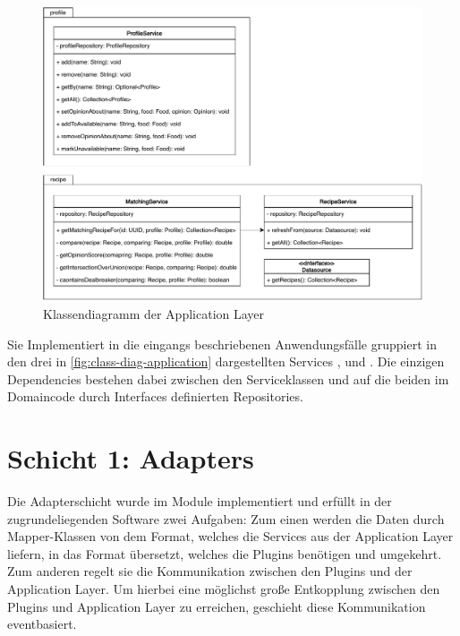 \begin{figure}[ht!]
    \includegraphics[width=0.98\columnwidth]{../diagrams/application_uml.pdf}
    \caption{Klassendiagramm der Application Layer}
    \label{fig:class-diag-application}
\end{figure}

Sie Implementiert in die eingangs beschriebenen Anwendungsfälle gruppiert in den drei in \autoref{fig:class-diag-application} dargestellten Services ,  und . Die einzigen Dependencies bestehen dabei zwischen den Serviceklassen und auf die beiden im Domaincode durch Interfaces definierten Repositories.

\section{Schicht 1: Adapters}
Die Adapterschicht wurde im Module  implementiert und erfüllt in der zugrundeliegenden Software zwei Aufgaben: Zum einen werden die Daten durch Mapper-Klassen von dem Format, welches die Services aus der Application Layer liefern, in das Format übersetzt, welches die Plugins benötigen und umgekehrt. Zum anderen regelt sie die Kommunikation zwischen den Plugins und der Application Layer. Um hierbei eine möglichst große Entkopplung zwischen den Plugins und Application Layer zu erreichen, geschieht diese Kommunikation eventbasiert.

